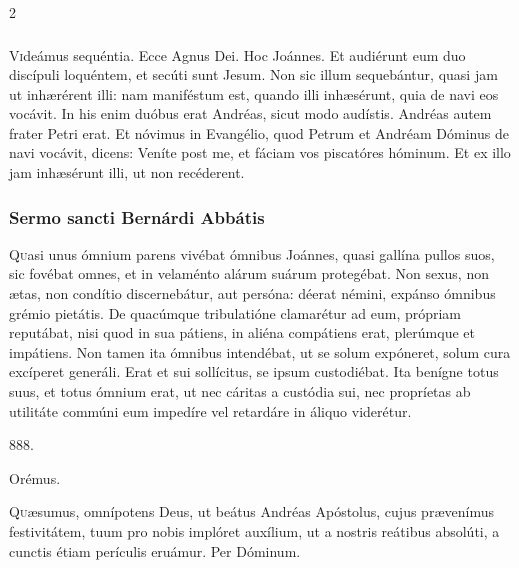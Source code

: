 \documentclass[9pt,twoside]{extarticle}
\begin{document}
\begin{multicols}{2}
\subsubsection*{\center {}}
\lettrine{V}ideámus sequéntia. Ecce Agnus Dei. Hoc Joánnes. Et audiérunt eum duo discípuli loquéntem, et secúti sunt Jesum. Non sic illum sequebántur, quasi jam ut inhærérent illi: nam maniféstum est, quando illi inhæsérunt, quia de navi eos vocávit. In his enim duóbus erat Andréas, sicut modo audístis. Andréas autem frater Petri erat. Et nóvimus in Evangélio, quod Petrum et Andréam Dóminus de navi vocávit, dicens: Veníte post me, et fáciam vos piscatóres hóminum. Et ex illo jam inhæsérunt illi, ut non recéderent.

\subsubsection*{\center Sermo sancti Bernárdi Abbátis}
\begin{center}\end{center}
\lettrine{Q}uasi unus ómnium parens vivébat ómnibus Joánnes, quasi gallína pullos suos, sic fovébat omnes, et in velaménto alárum suárum protegébat. Non sexus, non ætas, non condítio discernebátur, aut persóna: déerat némini, expánso ómnibus grémio pietátis. De quacúmque tribulatióne clamarétur ad eum, própriam reputábat, nisi quod in sua pátiens, in aliéna compátiens erat, plerúmque et impátiens. Non tamen ita ómnibus intendébat, ut se solum expóneret, solum cura excíperet generáli. Erat et sui sollícitus, se ipsum custodiébat. Ita benígne totus suus, et totus ómnium erat, ut nec cáritas a custódia sui, nec propríetas ab utilitáte commúni eum impedíre vel retardáre in áliquo viderétur.

\begin{tightlist}{}
\item {} 
\item {}
\item {} 888. 
\item {}
\item Orémus. \hfill {}
\end{tightlist}
\lettrine{Q}uæsumus, omnípotens Deus, ut beátus Andréas Apóstolus, cujus prævenímus festivitátem, tuum pro nobis implóret auxílium, ut a nostris reátibus absolúti, a cunctis étiam perículis eruámur. Per Dóminum.


\end{multicols}
\end{document}
